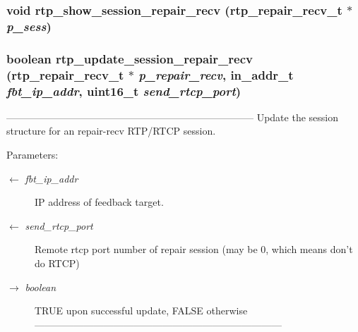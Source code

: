 \subsubsection{\setlength{\rightskip}{0pt plus 5cm}void rtp\_\-show\_\-session\_\-repair\_\-recv (\bf{rtp\_\-repair\_\-recv\_\-t} $\ast$ {\em p\_\-sess})}\label{rtp__repair__recv_8h_f5512608ba29d4342b401ef07646e38d}


\subsubsection{\setlength{\rightskip}{0pt plus 5cm}boolean rtp\_\-update\_\-session\_\-repair\_\-recv (\bf{rtp\_\-repair\_\-recv\_\-t} $\ast$ {\em p\_\-repair\_\-recv}, in\_\-addr\_\-t {\em fbt\_\-ip\_\-addr}, uint16\_\-t {\em send\_\-rtcp\_\-port})}\label{rtp__repair__recv_8h_40c0c2567996ea54f866f61490a7ac05}


--------------------------------------------------------------------------- Update the session structure for an repair-recv RTP/RTCP session.

\begin{Desc}
\item[Parameters:]
\begin{description}
\item[\mbox{$\leftarrow$} {\em fbt\_\-ip\_\-addr}]IP address of feedback target. \item[\mbox{$\leftarrow$} {\em send\_\-rtcp\_\-port}]Remote rtcp port number of repair session (may be 0, which means don't do RTCP) \item[\mbox{$\rightarrow$} {\em boolean}]TRUE upon successful update, FALSE otherwise --------------------------------------------------------------------------- \end{description}
\end{Desc}
